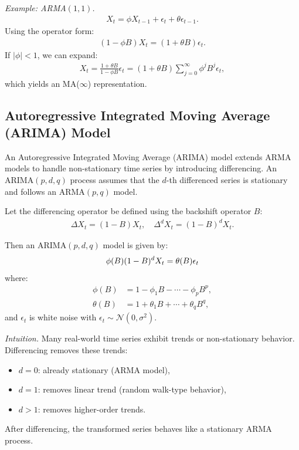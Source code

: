\documentclass[10pt,a4paper]{article}
\begin{document}
	\textit{Example: ARMA$(1,1)$.}
	\begin{align*}
	X_t = \phi X_{t-1} + \epsilon_t + \theta \epsilon_{t-1}.
	\end{align*}
	Using the operator form:
	\begin{align*}
	(1 - \phi B)X_t = (1 + \theta B)\epsilon_t.
	\end{align*}
	If $|\phi|<1$, we can expand:
	\begin{align*}
	X_t = \frac{1+\theta B}{1-\phi B}\epsilon_t
	= (1+\theta B)\sum_{j=0}^{\infty} \phi^j B^j \epsilon_t,
	\end{align*}
	which yields an MA($\infty$) representation.
	
	
	\subsection{Autoregressive Integrated Moving Average (ARIMA) Model}
	
	An Autoregressive Integrated Moving Average (ARIMA) model extends ARMA models to handle non-stationary time series by introducing differencing. An ARIMA$(p,d,q)$ process assumes that the $d$-th differenced series is stationary and follows an ARMA$(p,q)$ model.
	
	Let the differencing operator be defined using the backshift operator $B$:
	\begin{align*}
	\Delta X_t = (1 - B)X_t, \quad \Delta^d X_t = (1 - B)^d X_t.
	\end{align*}
	
	Then an ARIMA$(p,d,q)$ model is given by:
	\begin{align*}
	\large \phi(B)(1 - B)^d X_t = \theta(B)\epsilon_t
	\end{align*}
	where:
	\begin{align*}
	\phi(B) &= 1 - \phi_1 B - \cdots - \phi_p B^p, \\
	\theta(B) &= 1 + \theta_1 B + \cdots + \theta_q B^q,
	\end{align*}
	and ${\epsilon_t}$ is white noise with $\epsilon_t \sim \mathcal{N}(0,\sigma^2)$.
	
	\textit{Intuition.} Many real-world time series exhibit trends or non-stationary behavior. Differencing removes these trends:
	\begin{itemize}
	\item $d=0$: already stationary (ARMA model),
	\item $d=1$: removes linear trend (random walk-type behavior),
	\item $d>1$: removes higher-order trends.
	\end{itemize}
	After differencing, the transformed series behaves like a stationary ARMA process.
	
\end{document}
